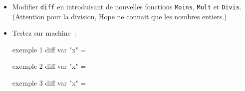 \begin{exercice}

\begin{itemize}
\item Modifier \texttt{diff} en introduisant de nouvelles fonctions
\texttt{Moins}, \texttt{Mult} et \texttt{Divis}. (Attention pour la
division, Hope ne connait que les nombres entiers.)
\item Testez sur machine~:
\begin{verbatimtab}
exemple 1 diff var "x" = 

exemple 2 diff var "x" = 

exemple 3 diff var "x" = 
\end{verbatimtab}
\end{itemize}
\end{exercice}
